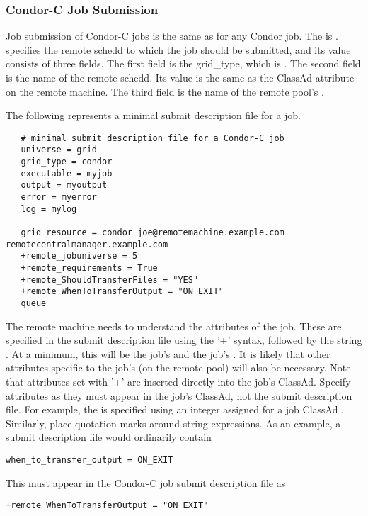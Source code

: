 \subsubsection{\label{sec:Condor-C-Submit}Condor-C Job Submission}
Job submission of Condor-C jobs is the same as for any Condor job.
The  is .
 specifies the remote schedd to which
the job should be submitted, and its value consists of three fields.
The first field is the grid\_type, which is .
The second field is the name of the remote schedd. Its value is the
same as the  ClassAd attribute  on the
remote machine.
The third field is the name of the remote pool's .

The following represents a minimal submit description file for
a job.

\footnotesize
\begin{verbatim}
   # minimal submit description file for a Condor-C job
   universe = grid
   grid_type = condor
   executable = myjob
   output = myoutput
   error = myerror
   log = mylog

   grid_resource = condor joe@remotemachine.example.com remotecentralmanager.example.com
   +remote_jobuniverse = 5
   +remote_requirements = True
   +remote_ShouldTransferFiles = "YES"
   +remote_WhenToTransferOutput = "ON_EXIT"
   queue
\end{verbatim}
\normalsize

The remote machine needs to understand the attributes of the job.
These are specified in the submit description file using the '+'
syntax, followed by the string .
At a minimum, this will be the job's  and the job's
.
It is likely that other attributes specific to the
job's  (on the remote pool) will also be necessary.
Note that attributes set with '+' are inserted directly into
the job's ClassAd.  
Specify attributes as they 
must appear in the job's ClassAd, not the submit description file. 
For example,
the  is specified using an integer assigned for
a job ClassAd .
Similarly, place quotation marks around string 
expressions.
As an example, a submit description file would ordinarily contain
\footnotesize
\begin{verbatim}
when_to_transfer_output = ON_EXIT
\end{verbatim}
\normalsize
This must appear in the Condor-C job submit description file as
\footnotesize
\begin{verbatim}
+remote_WhenToTransferOutput = "ON_EXIT"
\end{verbatim}
\normalsize

